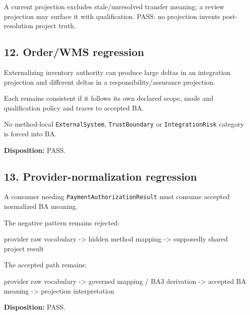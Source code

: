 \documentclass[
  11pt,
  a4paper,
]{article}
\newenvironment{Shaded}{}{}
\newcommand{\NormalTok}[1]{#1}
\begin{document}
A current projection excludes stale/unresolved transfer meaning; a
review projection may surface it with qualification. PASS: no projection
invents post-resolution project truth.

\subsection{12. Order/WMS regression}\label{orderwms-regression}

Externalizing inventory authority can produce large deltas in an
integration projection and different deltas in a
responsibility/assurance projection.

Each remains consistent if it follows its own declared scope, mode and
qualification policy and traces to accepted BA.

No method-local \texttt{ExternalSystem}, \texttt{TrustBoundary} or
\texttt{IntegrationRisk} category is forced into BA.

\textbf{Disposition:} PASS.

\subsection{13. Provider-normalization
regression}\label{provider-normalization-regression}

A consumer needing \texttt{PaymentAuthorizationResult} must consume
accepted normalized BA meaning.

The negative pattern remains rejected:

\begin{Shaded}
\begin{Highlighting}[]
\NormalTok{provider raw vocabulary}
\NormalTok{    {-}\textgreater{} hidden method mapping}
\NormalTok{        {-}\textgreater{} supposedly shared project result}
\end{Highlighting}
\end{Shaded}

The accepted path remains:

\begin{Shaded}
\begin{Highlighting}[]
\NormalTok{provider raw vocabulary}
\NormalTok{    {-}\textgreater{} governed mapping / BA3 derivation}
\NormalTok{        {-}\textgreater{} accepted BA meaning}
\NormalTok{            {-}\textgreater{} projection interpretation}
\end{Highlighting}
\end{Shaded}

\textbf{Disposition:} PASS.
\end{document}
